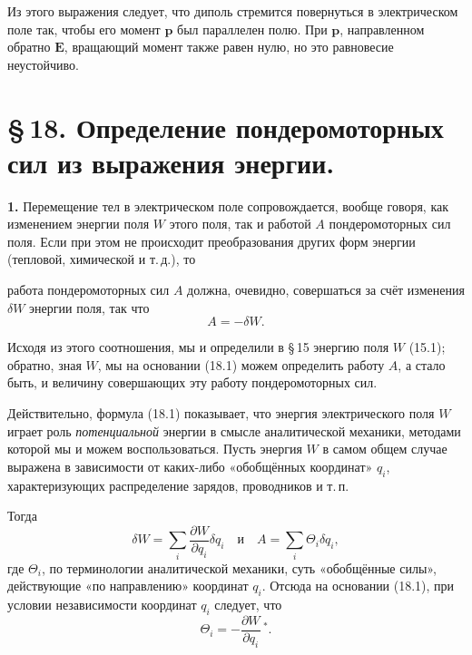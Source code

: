 \documentclass[a4paper,10pt]{article}
\begin{document}
Из этого выражения следует, что диполь стремится повернуться в
электрическом поле так, чтобы его момент $\mathbf{p}$ был параллелен
полю. При $\mathbf{p}$, направленном обратно $\mathbf{E}$, вращающий
момент также равен нулю, но это равновесие неустойчиво.


\section*{\S\,18. Определение пондеромоторных сил из выражения энергии.}


\textbf{1.} Перемещение тел в электрическом поле сопровождается,
вообще говоря, как изменением энергии поля $W$ этого поля, так и
работой $A$ пондеромоторных сил поля. Если при этом не происходит
преобразования других форм энергии (тепловой, химической и т.\,д.), то


работа пондеромоторных сил $A$ должна, очевидно, совершаться за счёт
изменения $\delta W$ энергии поля, так что
\begin{equation}
    A = -\delta W.
    \tag{18.1}
\end{equation}

Исходя из этого соотношения, мы и определили в §\,15 энергию поля
$W$ (15.1); обратно, зная $W$, мы на основании (18.1) можем определить
работу $A$, а стало быть, и величину совершающих эту работу
пондеромоторных сил.

Действительно, формула (18.1) показывает, что энергия электрического
поля $W$ играет роль \textit{потенциальной} энергии в смысле
аналитической механики, методами которой мы и можем воспользоваться.
Пусть энергия $W$ в самом общем случае выражена в зависимости от
каких-либо «обобщённых координат» $q_i$, характеризующих распределение
зарядов, проводников и т.\,п.

Тогда
\begin{equation}
    \delta W = \sum_i \frac{\partial W}{\partial q_i}\delta q_i
    \quad\text{и}\quad
    A = \sum_i \Theta_i\delta q_i,
    \tag{18.2}
\end{equation}
где $\Theta_i$, по терминологии аналитической механики, суть
«обобщённые силы», действующие «по направлению» координат $q_i$.
Отсюда на основании (18.1), при условии независимости координат $q_i$
следует, что
\begin{equation}
    \Theta_i = -\frac{\partial W}{\partial q_i}\,^*.
    \tag{18.3}
\end{equation}
\end{document}
